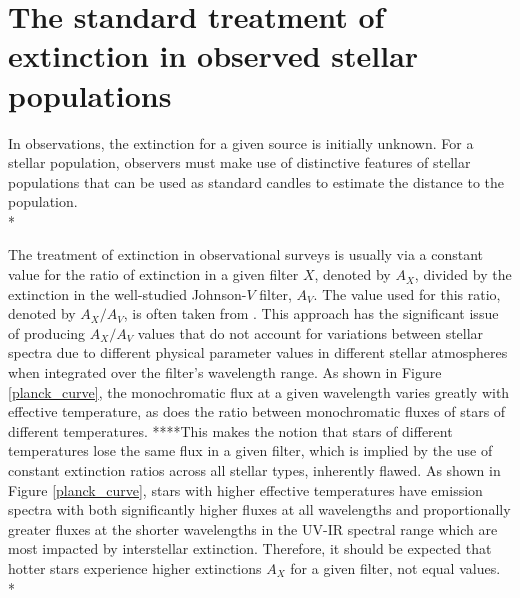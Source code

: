 \documentclass[12pt, a4paper]{report}
\begin{document}
\section{The standard treatment of extinction in observed stellar populations} \label{standard_ext}

In observations, the extinction for a given source is initially unknown. For a stellar population, observers must make use of distinctive features of stellar populations that can be used as standard candles to estimate the distance to the population. \\*

The treatment of extinction in observational surveys is usually via a constant value for the ratio of extinction in a given filter $X$, denoted by $A_{X}$, divided by the extinction in the well-studied Johnson-$V$ filter, $A_{V}$. The value used for this ratio, denoted by $A_{X}/A_{V}$, is often taken from \cite{1985ApJ...288..618R}. This approach has the significant issue of producing $A_{X}/A_{V}$ values that do not account for  variations between stellar spectra due to different physical parameter values in different stellar atmospheres when integrated over the filter's wavelength range. As shown in Figure \ref{planck_curve}, the monochromatic flux at a given wavelength varies greatly with effective temperature, as does the ratio between monochromatic fluxes of stars of different temperatures. ****This makes the notion that stars of different temperatures lose the same flux in a given filter, which is implied by the use of constant extinction ratios across all stellar types, inherently flawed. As shown in Figure \ref{planck_curve}, stars with higher effective temperatures have emission spectra with both significantly higher fluxes at all wavelengths and proportionally greater fluxes at the shorter wavelengths in the UV-IR spectral range which are most impacted by interstellar extinction. Therefore, it should be expected that hotter stars experience higher extinctions $A_{X}$ for a given filter, not equal values.\\*
\end{document}
